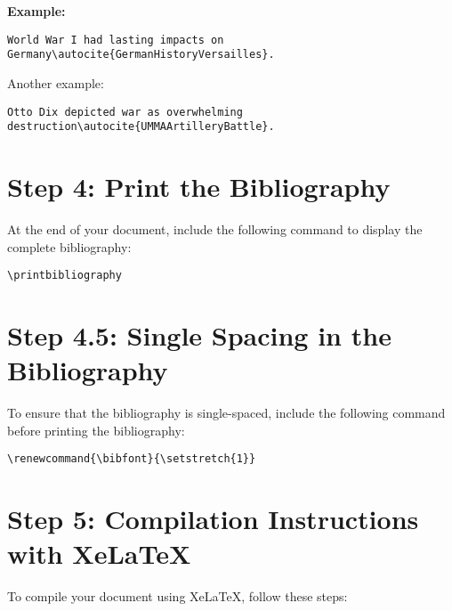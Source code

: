 \documentclass{article}
\begin{document}
\textbf{Example:}

\begin{lstlisting}
World War I had lasting impacts on Germany\autocite{GermanHistoryVersailles}.
\end{lstlisting}

Another example:

\begin{lstlisting}
Otto Dix depicted war as overwhelming destruction\autocite{UMMAArtilleryBattle}.
\end{lstlisting}

\vspace{1em}

\section*{Step 4: Print the Bibliography}

At the end of your document, include the following command to display the complete bibliography:

\begin{lstlisting}
\printbibliography
\end{lstlisting}

\vspace{1em}

\section*{Step 4.5: Single Spacing in the Bibliography}

To ensure that the bibliography is single-spaced, include the following command before printing the bibliography:

\begin{lstlisting}
\renewcommand{\bibfont}{\setstretch{1}}
\end{lstlisting}

\vspace{1em}

\section*{Step 5: Compilation Instructions with XeLaTeX}

To compile your document using XeLaTeX, follow these steps:
\end{document}
